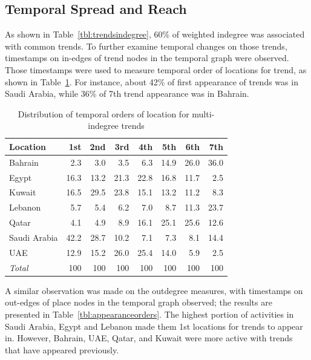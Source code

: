 \documentclass{llncs}
\begin{document}
\subsection{Temporal Spread and Reach}

As shown in Table~\ref{tbl:trendsindegree}, 60\% of weighted
indegree was associated with common trends. To further examine temporal
changes on those trends, timestamps on in-edges of trend nodes in the
temporal graph were observed. Those timestamps were used to measure
temporal order of locations for trend, as shown in
Table~\ref{tbl:temporders}. For instance, about 42\% of first
appearance of trends was in Saudi Arabia, while 36\% of 7th trend
appearance was in Bahrain.

\begin{table}[!h]
\centering
\caption{Distribution of temporal orders of location for multi-indegree trends}
\begin{tabular}{@{}lrrrrrrr@{}}
\toprule
Location & 1st & 2nd & 3rd & 4th & 5th & 6th & 7th \\ 
\midrule
Bahrain &          2.3 &    3.0 &    3.5 &  6.3 & 14.9 & 26.0 & 36.0 \\
Egypt &            16.3 & 13.2 & 21.3 & 22.8 & 16.8 & 11.7 &   2.5 \\
Kuwait &          16.5 & 29.5 & 23.8 & 15.1 & 13.2 & 11.2 &   8.3\\
Lebanon &         5.7 &   5.4 &   6.2 &   7.0 &   8.7 & 11.3 & 23.7 \\
Qatar &              4.1 &   4.9 &   8.9 & 16.1 & 25.1 & 25.6 & 12.6 \\
Saudi Arabia & 42.2 & 28.7 & 10.2 &   7.1 &   7.3 &   8.1 & 14.4 \\
UAE &              12.9 & 15.2 & 26.0 & 25.4 & 14.0 &   5.9 &   2.5\\
\midrule
{\emph{Total}} & 100 & 100 & 100 & 100 & 100 &  100 &   100\\
\bottomrule
\end{tabular}
\label{tbl:temporders}
\end{table}

A similar observation was made on the outdegree measures, with
timestamps on out-edges of place nodes in the temporal graph observed;
the results are presented in Table~\ref{tbl:appearanceorders}. The
highest portion of activities in Saudi Arabia, Egypt and Lebanon made
them 1st locations for trends to appear in. However, Bahrain, UAE, Qatar,
and Kuwait were more active with trends that have appeared previously.
\end{document}
